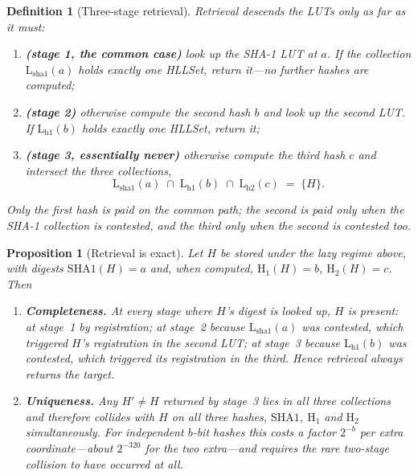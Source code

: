 \documentclass[11pt,a4paper]{article}
\newtheorem{definition}[theorem]{Definition}
\newtheorem{proposition}[theorem]{Proposition}
\theoremstyle{remark}
\begin{document}
\begin{definition}[Three-stage retrieval]
\label{def:retrieval}
Retrieval descends the LUTs only as far as it must:
\begin{enumerate}[leftmargin=*,nosep]
  \item \textbf{(stage 1, the common case)} look up the SHA-1 LUT at $a$. If the
    collection $\mathrm{L}_\text{sha1}(a)$ holds exactly one HLLSet, return
    it---no further hashes are computed;
  \item \textbf{(stage 2)} otherwise compute the second hash $b$ and look up the
    second LUT. If $\mathrm{L}_\text{h1}(b)$ holds exactly one HLLSet, return
    it;
  \item \textbf{(stage 3, essentially never)} otherwise compute the third hash
    $c$ and intersect the three collections,
    \begin{equation}
      \label{eq:intersection}
      \mathrm{L}_\text{sha1}(a) \;\cap\; \mathrm{L}_\text{h1}(b) \;\cap\;
      \mathrm{L}_\text{h2}(c) \;=\; \{H\}.
    \end{equation}
\end{enumerate}
Only the first hash is paid on the common path; the second is paid only when
the SHA-1 collection is contested, and the third only when the second is
contested too.
\end{definition}

\begin{proposition}[Retrieval is exact]
\label{prop:retrieval}
Let $H$ be stored under the lazy regime above, with digests $\mathrm{SHA1}(H)=a$
and, when computed, $\mathrm{H}_1(H)=b$, $\mathrm{H}_2(H)=c$. Then
\begin{enumerate}[leftmargin=*,nosep]
  \item \textbf{Completeness.} At every stage where $H$'s digest is looked up,
    $H$ is present: at stage~1 by registration; at stage~2 because
    $\mathrm{L}_\text{sha1}(a)$ was contested, which triggered $H$'s
    registration in the second LUT; at stage~3 because
    $\mathrm{L}_\text{h1}(b)$ was contested, which triggered its registration in
    the third. Hence retrieval always returns the target.
  \item \textbf{Uniqueness.} Any $H'\neq H$ returned by stage~3 lies in all
    three collections and therefore collides with $H$ on all three hashes,
    $\mathrm{SHA1}$, $\mathrm{H}_1$ and $\mathrm{H}_2$ simultaneously. For
    independent $b$-bit hashes this costs a factor $2^{-b}$ per extra
    coordinate---about $2^{-320}$ for the two extra---and requires the rare
    two-stage collision to have occurred at all.
\end{enumerate}
\end{proposition}
\end{document}
